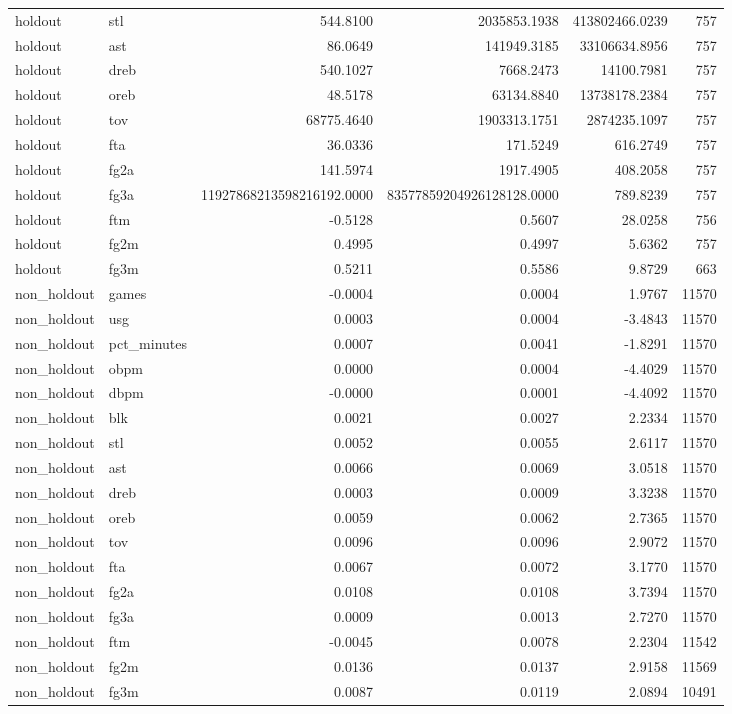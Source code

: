 \begin{table}
\begin{tabular}{llrrrr}
holdout & stl & 544.8100 & 2035853.1938 & 413802466.0239 & 757 \\
holdout & ast & 86.0649 & 141949.3185 & 33106634.8956 & 757 \\
holdout & dreb & 540.1027 & 7668.2473 & 14100.7981 & 757 \\
holdout & oreb & 48.5178 & 63134.8840 & 13738178.2384 & 757 \\
holdout & tov & 68775.4640 & 1903313.1751 & 2874235.1097 & 757 \\
holdout & fta & 36.0336 & 171.5249 & 616.2749 & 757 \\
holdout & fg2a & 141.5974 & 1917.4905 & 408.2058 & 757 \\
holdout & fg3a & 11927868213598216192.0000 & 83577859204926128128.0000 & 789.8239 & 757 \\
holdout & ftm & -0.5128 & 0.5607 & 28.0258 & 756 \\
holdout & fg2m & 0.4995 & 0.4997 & 5.6362 & 757 \\
holdout & fg3m & 0.5211 & 0.5586 & 9.8729 & 663 \\
non\_holdout & games & -0.0004 & 0.0004 & 1.9767 & 11570 \\
non\_holdout & usg & 0.0003 & 0.0004 & -3.4843 & 11570 \\
non\_holdout & pct\_minutes & 0.0007 & 0.0041 & -1.8291 & 11570 \\
non\_holdout & obpm & 0.0000 & 0.0004 & -4.4029 & 11570 \\
non\_holdout & dbpm & -0.0000 & 0.0001 & -4.4092 & 11570 \\
non\_holdout & blk & 0.0021 & 0.0027 & 2.2334 & 11570 \\
non\_holdout & stl & 0.0052 & 0.0055 & 2.6117 & 11570 \\
non\_holdout & ast & 0.0066 & 0.0069 & 3.0518 & 11570 \\
non\_holdout & dreb & 0.0003 & 0.0009 & 3.3238 & 11570 \\
non\_holdout & oreb & 0.0059 & 0.0062 & 2.7365 & 11570 \\
non\_holdout & tov & 0.0096 & 0.0096 & 2.9072 & 11570 \\
non\_holdout & fta & 0.0067 & 0.0072 & 3.1770 & 11570 \\
non\_holdout & fg2a & 0.0108 & 0.0108 & 3.7394 & 11570 \\
non\_holdout & fg3a & 0.0009 & 0.0013 & 2.7270 & 11570 \\
non\_holdout & ftm & -0.0045 & 0.0078 & 2.2304 & 11542 \\
non\_holdout & fg2m & 0.0136 & 0.0137 & 2.9158 & 11569 \\
non\_holdout & fg3m & 0.0087 & 0.0119 & 2.0894 & 10491 \\
\bottomrule
\end{tabular}
\end{table}
